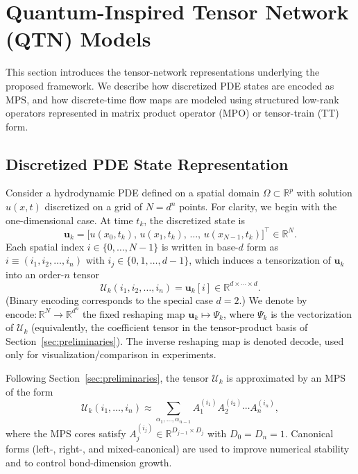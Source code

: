 \documentclass[letterpaper, 10 pt, conference]{ieeeconf}  %
\begin{document}
\section{Quantum-Inspired Tensor Network (QTN) Models}
\label{sec:QTN}

This section introduces the tensor-network representations underlying the
proposed framework. We describe how discretized PDE states are encoded as MPS,
and how discrete-time flow maps are modeled using structured low-rank operators
represented in matrix product operator (MPO) or tensor-train (TT) form.

\subsection{Discretized PDE State Representation}

Consider a hydrodynamic PDE defined on a spatial domain
$\Omega \subset \mathbb{R}^{p}$ with solution $u(x,t)$ discretized on a grid of
$N=d^n$ points. For clarity, we begin with the one-dimensional case. At time
$t_k$, the discretized state is
\begin{equation}
\mathbf{u}_k =
\big[u(x_0,t_k),\, u(x_1,t_k),\, \dots,\, u(x_{N-1},t_k)\big]^\top
\in \mathbb{R}^N .
\end{equation}
Each spatial index $i \in \{0,\dots,N-1\}$ is written in base-$d$ form as
$i \equiv (i_1,i_2,\dots,i_n)$ with $i_j \in \{0,1,\dots,d-1\}$, which induces a
tensorization of $\mathbf{u}_k$ into an order-$n$ tensor
\begin{equation}
\mathcal{U}_k(i_1,i_2,\dots,i_n) = \mathbf{u}_k[i]
\in \mathbb{R}^{d \times \cdots \times d}.
\end{equation}
(Binary encoding corresponds to the special case $d=2$.) We denote by
$\mathrm{encode}:\mathbb{R}^N \to \mathbb{R}^{d^n}$ the fixed reshaping map
$\mathbf{u}_k \mapsto \Psi_k$, where $\Psi_k$ is the vectorization of
$\mathcal{U}_k$ (equivalently, the coefficient tensor in the tensor-product
basis of Section~\ref{sec:preliminaries}). The inverse reshaping map is denoted
$\mathrm{decode}$, used only for visualization/comparison in experiments.

Following Section~\ref{sec:preliminaries}, the tensor $\mathcal{U}_k$ is
approximated by an MPS of the form
\begin{equation}
\mathcal{U}_k(i_1,\dots,i_n)
\approx
\sum_{\alpha_1,\dots,\alpha_{n-1}}
A_1^{(i_1)} A_2^{(i_2)} \cdots A_n^{(i_n)},
\label{eq:mps_state_rep}
\end{equation}
where the MPS cores satisfy $A_j^{(i_j)} \in \mathbb{R}^{D_{j-1} \times D_j}$
with $D_0 = D_n = 1$. Canonical forms (left-, right-, and mixed-canonical) are
used to improve numerical stability and to control bond-dimension growth.
\end{document}
